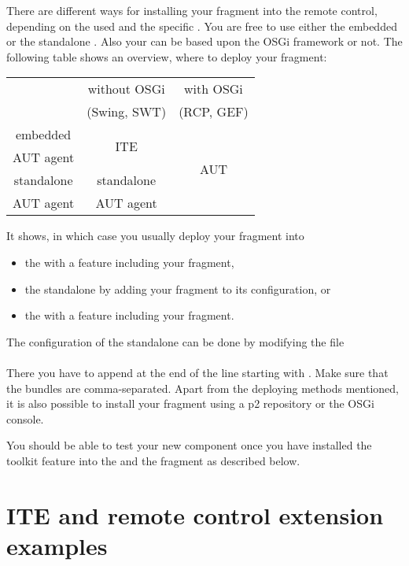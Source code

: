 There are different ways for installing your fragment into the remote
control, depending on the  \gdagent{} used and the specific \gdaut{}. You are free to
use either the embedded \gdagent{} or the standalone \gdagent{}. Also your \gdaut{}
can be based upon the OSGi framework or not. The following table shows an
overview, where to deploy your fragment:

\begin{center}
\begin{tabular}{|c||c|c|}
\hline
~ & without OSGi & with OSGi\\
~ & (Swing, SWT) & (RCP, GEF)\\
\hline\hline
embedded & \multirow{2}{*}{ITE} & \multirow{4}{*}{AUT}\\
AUT agent & & \\
\hhline{--~}
standalone & standalone & \\
AUT agent  & AUT agent  & \\
\hline
\end{tabular}
\end{center}

It shows, in which case you usually deploy your fragment into
\begin{itemize}
  \item the \ite{} with a feature including your fragment,
  \item the standalone \gdagent{} by adding your fragment to its configuration,
        or
  \item the \gdaut{} with a feature including your fragment.
\end{itemize}

The configuration of the standalone \gdagent{} can be done by modifying the
file\\
\\
There you have to append  at the end of the
line starting with . Make sure that the bundles are
comma-separated. Apart from the  deploying methods mentioned, it is also
possible to install your fragment using a p2 repository or the OSGi console.

You should be able to test your new component once you have installed the
toolkit feature into the \ite{} and the fragment as described below.

\section{ITE and remote control extension examples}
\label{extensionExamples}

